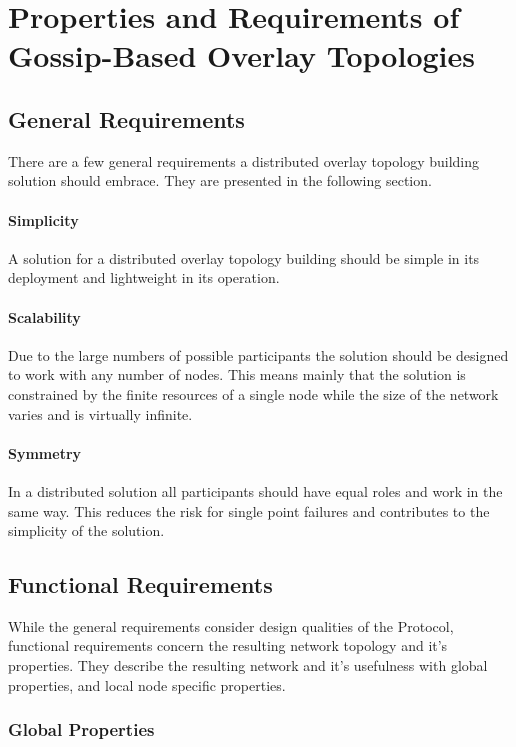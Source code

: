 \chapter{Properties and Requirements of Gossip-Based Overlay Topologies} 
\label{chap:properties}

\section{General Requirements}
There are a few general requirements a distributed overlay topology building
solution should embrace. They are presented in the following section.
\subsubsection{Simplicity}
A solution for a distributed overlay topology building should be simple in its
deployment and lightweight in its operation. 
\subsubsection{Scalability}
Due to the large numbers of possible participants the solution should be
designed to work with any number of nodes. This means mainly that the solution
is constrained by the finite resources of a single node while the size of the
network varies and is virtually infinite.

\subsubsection{Symmetry}
In a distributed solution all participants should have equal roles and work in
the same way. This reduces the risk for single point failures and contributes to
the simplicity of the solution.

\section{Functional Requirements}
While the general requirements consider design qualities of the Protocol,
functional requirements concern the resulting network topology and it's
properties. They describe the resulting network and it’s usefulness with global
properties, and local node specific properties.

\subsection{Global Properties}

